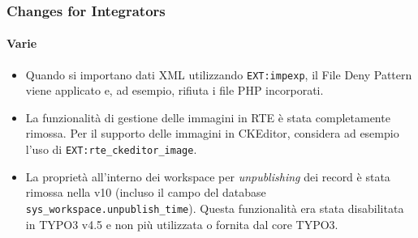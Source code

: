 \begin{frame}[fragile]
	\frametitle{Changes for Integrators}
	\framesubtitle{Varie}

	\lstset{basicstyle=\tiny\ttfamily}

	\begin{itemize}

		\item Quando si importano dati XML utilizzando \texttt{EXT:impexp}, il File Deny Pattern viene applicato
			e, ad esempio, rifiuta i file PHP incorporati.

		\item La funzionalità di gestione delle immagini in RTE è stata completamente rimossa.
			Per il supporto delle immagini in CKEditor, considera ad esempio l'uso di \texttt{EXT:rte\_ckeditor\_image}.

		\item La proprietà all'interno dei workspace per \textit{unpublishing} dei record è stata rimossa nella v10
			(incluso il campo del database \texttt{sys\_workspace.unpublish\_time}). Questa funzionalità era stata
			disabilitata in TYPO3 v4.5 e non più utilizzata o fornita dal core TYPO3.

	\end{itemize}

\end{frame}


